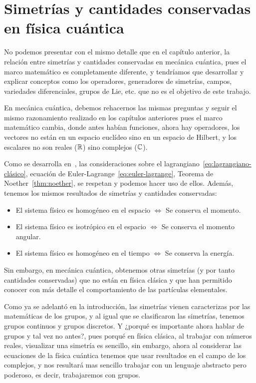 \section{Simetrías y cantidades conservadas en física cuántica}\label{sec:simetrías-y-cantidades-conservadas-en-física-cuántica}

No podemos presentar con el mismo detalle que en el capítulo anterior, la relación entre simetrías y cantidades conservadas en mecánica cuántica, pues el marco matemático es completamente diferente, y tendríamos que desarrollar y explicar conceptos como los operadores, generadores de simetrías, campos, variedades diferenciales, grupos de Lie, etc. que no es el objetivo de este trabajo.

En mecánica cuántica, debemos rehacernos las mismas preguntas y seguir el mismo razonamiento realizado en los capítulos anteriores pues el marco matemático cambia, donde antes habían funciones, ahora hay operadores, los vectores no están en un espacio euclídeo sino en un espacio de Hilbert, y los escalares no son reales ($\mathbb{R}$) sino complejos ($\mathbb{C}$).

Como se desarrolla en~\cite{QMS}, las consideraciones sobre el lagrangiano~\eqref{eq:lagrangiano-clásico}, ecuación de Euler-Lagrange~\eqref{eq:euler-lagrange}, Teorema de Noether~\eqref{thm:noether}, se respetan y podemos hacer uso de ellos.
Además, tenemos los mismos resultados de simetrías y cantidades conservadas:

\begin{itemize}
	\item El sistema físico es homogéneo en el espacio $\Leftrightarrow$ Se conserva el momento.
	\item El sistema físico es isotrópico en el espacio $\Leftrightarrow$ Se conserva el momento angular.
	\item El sistema físico es homogéneo en el tiempo $\Leftrightarrow$ Se conserva la energía.
\end{itemize}

Sin embargo, en mecánica cuántica, obtenemos otras simetrías (y por tanto cantidades conservadas) que no están en física clásica y que han permitido conocer con más detalle el comportamiento de las partículas elementales.

Como ya se adelantó en la introducción, las simetrías vienen caracterizas por las matemáticas de los grupos, y al igual que se clasificaron las simetrías, tenemos grupos continuos y grupos discretos.
Y ¿porqué es importante ahora hablar de grupos y tal vez no antes?, pues porqué en física clásica, al trabajar con números reales, visualizar una simetría es sencillo, sin embargo, ahora al considerar las ecuaciones de la física cuántica tenemos que usar resultados en el campo de los complejos, y nos resultará mas sencillo trabajar con un lenguaje abstracto pero poderoso, es decir, trabajaremos con grupos.

